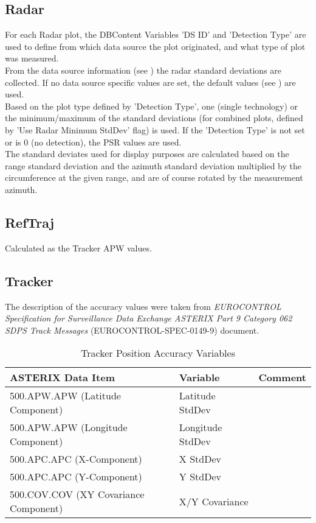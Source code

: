 \subsection{Radar}

For each Radar plot, the DBContent Variables 'DS ID' and 'Detection Type' are used to define from which data source the plot originated, and what type of plot was measured. \\

From the data source information (see ) the radar standard deviations are collected. If no data source specific values are set, the default values (see ) are used. \\

Based on the plot type defined by 'Detection Type', one (single technology) or the minimum/maximum of the standard deviations (for combined plots, defined by 'Use Radar Minimum StdDev' flag) is used. If the 'Detection Type' is not set or is 0 (no detection), the PSR values are used. \\ 

The standard deviates used for display purposes are calculated based on the range standard deviation and the azimuth standard deviation multiplied by the circumference at the given range, and are of course rotated by the measurement azimuth.

\subsection{RefTraj}

Calculated as the Tracker APW values.

\subsection{Tracker}

The description of the accuracy values were taken from \textit{EUROCONTROL Specification for Surveillance Data Exchange ASTERIX Part 9 Category 062 SDPS Track Messages} (EUROCONTROL-SPEC-0149-9) document.

\begin{center}
 \begin{table}[H]
  \begin{tabularx}{\textwidth}{ | X | l | l | }
    \hline
    \textbf{ASTERIX Data Item} & \textbf{Variable} & \textbf{Comment} \\ \hline
     500.APW.APW (Latitude Component) & Latitude StdDev &  \\ \hline
     500.APW.APW (Longitude Component) & Longitude StdDev  &  \\ \hline
     500.APC.APC (X-Component) & X StdDev &  \\ \hline
     500.APC.APC (Y-Component) & Y StdDev  &  \\ \hline
     500.COV.COV (XY Covariance Component) & X/Y Covariance  &  \\ \hline
\end{tabularx}
  \caption{Tracker Position Accuracy Variables}
\end{table}
\end{center}

